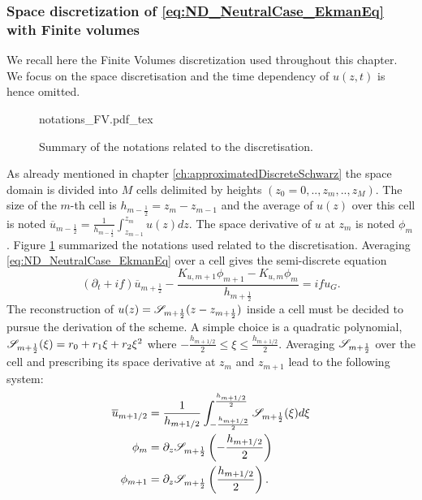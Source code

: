 \subsubsection{Space discretization of
\eqref{eq:ND_NeutralCase_EkmanEq} with Finite volumes}
\label{sec:ND_NeutralCase_recallSplines}
We recall here the Finite Volumes discretization used throughout
this chapter. We focus on the space discretisation and the time
dependency of $u(z, t)$ is hence omitted.
\begin{figure}
	\centering
	{notations_FV.pdf_tex}
	\caption{Summary of the notations related to the discretisation.}
	\label{fig:ND_NeutralCase_summary_notations}
\end{figure}
\par
As already mentioned in chapter \ref{ch:approximatedDiscreteSchwarz}
the space domain is divided into $M$ cells delimited by
heights $(z_0=0, .., z_m, .., z_M)$. The size of the $m$-th cell
is $h_{m-\frac{1}{2}}=z_{m}-z_{m-1}$ and the average of $u(z)$
over this cell is noted
$\overline{u}_{m-\frac{1}{2}}=\frac{1} {h_{m-\frac{1}{2}}}
\int_{z_{m-1}}^{z_m}u(z)dz$.
The space derivative of $u$ at $z_m$ is noted $\phi_{m}$.
Figure \ref{fig:ND_NeutralCase_summary_notations} summarized
the notations used related to the discretisation.
Averaging \eqref{eq:ND_NeutralCase_EkmanEq} over a cell gives
the semi-discrete equation
\begin{equation}
\label{eq:ND_NeutralCase_semiDiscreteEkmanEq}
	(\partial_t + if) \overline{u}_{m+\frac{1}{2}} - 
	\frac{K_{u, m+1} \phi_{m+1} - K_{u, m} \phi_{m}}
		{h_{m+\frac{1}{2}}} = i f u_G.
\end{equation}
The reconstruction of $u(z) = {\cal S}_{m+\frac{1}{2}}
				(z - z_{m+\frac{1}{2}})$
				inside a cell must be decided
to pursue the derivation of the scheme. A simple choice is
a quadratic polynomial,
${\cal S}_{m+\frac{1}{2}}(\xi) = r_0 + r_1 \xi + r_2 \xi^2$ where
$-\frac{h_{m+1/2}}{2} \leq \xi \leq \frac{h_{m+1/2}}{2}$.
Averaging ${\cal S}_{m+\frac{1}{2}}$ over the cell and
prescribing its space derivative at $z_{m}$ and $z_{m+1}$
lead to the following system:
\begin{equation}
	\begin{aligned}
		\overline{u}_{m+1/2} &= \frac{1}{h_{m+1/2}}
		\int_{-\frac{h_{m+1/2}}{2}}^{\frac{h_{m+1/2}}{2}}
		{\cal S}_{m+\frac{1}{2}}(\xi)d\xi\\
		\phi_m &= \partial_z {\cal S}_{m+\frac{1}{2}}
		\left(-\frac{h_{m+1/2}}{2}\right)\\
		\phi_{m+1} &=
		\partial_z {\cal S}_{m+\frac{1}{2}}
		\left(\frac{h_{m+1/2}}{2}\right).
	\end{aligned}
\end{equation}
